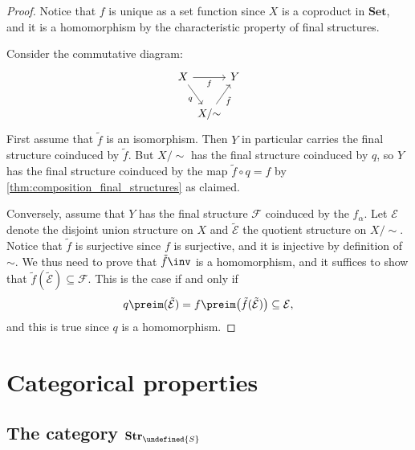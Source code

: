 \documentclass[article, a4paper, 11pt, oneside]{memoir}
\let\mathfrak\undefined
\numberwithin{equation}{chapter}
\newcommand{\calE}{\mathcal{E}}
\newcommand{\calF}{\mathcal{F}}
\newcommand{\strucS}{\mathfrak{S}}
\newcommand{\ncat}[1]{\mathbf{#1}} %
\newcommand{\catSet}{\ncat{Set}} %
\newcommand{\catStruc}[1]{\ncat{Str}_{#1}} %
\newcommand{\catStrucS}{\catStruc{\strucS}} %
\begin{document}
\begin{proof}
    Notice that $f$ is unique as a set function since $X$ is a coproduct in $\catSet$, and it is a homomorphism by the characteristic property of final structures.

    Consider the commutative diagram:
    \begin{equation*}
        \begin{tikzcd}[column sep=0em]
            X
                \ar[rr, "f", swap]
                \ar[dr, "q", swap]
            && Y \\
            & X/{\sim}
                \ar[ur, "\tilde{f}", swap]
        \end{tikzcd}
    \end{equation*}
    First assume that $\tilde{f}$ is an isomorphism. Then $Y$ in particular carries the final structure coinduced by $\tilde{f}$. But $X/{\sim}$ has the final structure coinduced by $q$, so $Y$ has the final structure coinduced by the map $\tilde{f} \circ q = f$ by \cref{thm:composition_final_structures} as claimed.

    Conversely, assume that $Y$ has the final structure $\calF$ coinduced by the $f_\alpha$. Let $\calE$ denote the disjoint union structure on $X$ and $\tilde{\calE}$ the quotient structure on $X/{\sim}$. Notice that $\tilde{f}$ is surjective since $f$ is surjective, and it is injective by definition of $\sim$. We thus need to prove that $\tilde{f}\inv$ is a homomorphism, and it suffices to show that $\tilde{f}(\tilde{\calE}) \subseteq \calF$. This is the case if and only if
    \begin{equation*}
        q\preim(\tilde{\calE})
            = f\preim \bigl( \tilde{f}(\tilde{\calE}) \bigr)
            \subseteq \calE,
    \end{equation*}
    and this is true since $q$ is a homomorphism.
\end{proof}


\section{Categorical properties} \label{sec:structure_categorical}

\subsection{The category $\catStrucS$}
\end{document}
